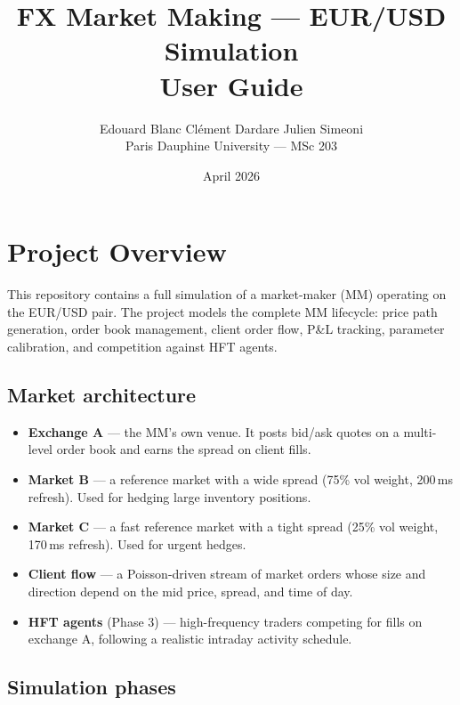 \documentclass[12pt,a4paper]{article}
\title{\textbf{FX Market Making --- EUR/USD Simulation\\[6pt]
       \large User Guide}}
\author{
  Edouard Blanc \quad Cl\'ement Dardare \quad Julien Simeoni \\[4pt]
  \small Paris Dauphine University --- MSc 203
}
\date{April 2026}
\begin{document}
\maketitle
\tableofcontents
\newpage

\section{Project Overview}

This repository contains a full simulation of a market-maker (MM) operating on
the EUR/USD pair. The project models the complete MM lifecycle: price path
generation, order book management, client order flow, P\&L tracking, parameter
calibration, and competition against HFT agents.

\subsection*{Market architecture}

\begin{itemize}
  \item \textbf{Exchange A} --- the MM's own venue. It posts bid/ask quotes on a
        multi-level order book and earns the spread on client fills.
  \item \textbf{Market B} --- a reference market with a wide spread
        (75\% vol weight, 200\,ms refresh). Used for hedging large inventory positions.
  \item \textbf{Market C} --- a fast reference market with a tight spread
        (25\% vol weight, 170\,ms refresh). Used for urgent hedges.
  \item \textbf{Client flow} --- a Poisson-driven stream of market orders whose
        size and direction depend on the mid price, spread, and time of day.
  \item \textbf{HFT agents} (Phase 3) --- high-frequency traders competing for
        fills on exchange A, following a realistic intraday activity schedule.
\end{itemize}

\subsection*{Simulation phases}
\end{document}
